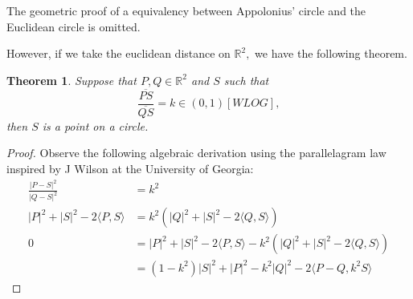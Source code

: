 \documentclass[letter]{article}
\newtheorem{theorem}{Theorem}
\newenvironment{menumerate}{%
  \edef\backupindent{\the\parindent}%
  \enumerate%
  \setlength{\parindent}{\backupindent}%
}{\endenumerate}
\begin{document}
\begin{menumerate}
        The geometric proof of a equivalency between Appolonius' circle and the
        Euclidean circle is omitted.

        However, if we take the euclidean distance on $\mathbb{R}^2,$ we have the following theorem.
        \begin{theorem}
            Suppose that $P,Q \in \mathbb{R}^2$ and $S$ such that 
            $$\frac{\overline{PS}}{\overline{QS}} = k \in (0,1)[WLOG],$$
            then $S$ is a point on a circle.
        \end{theorem}
        \begin{proof}
            Observe the following algebraic derivation using the parallelagram law inspired by J Wilson at the University of Georgia:
            \begin{equation}
                \begin{aligned}
                    \frac{|P-S|^2}{|Q-S|^2} &= k^2 \\
                     |P|^2 + |S|^2 -2\langle P, S \rangle &= k^2(|Q|^2 + |S|^2 - 2\langle Q,S\rangle ) \\
                     0&= |P|^2 + |S|^2 -2\langle P, S \rangle - k^2(|Q|^2 + |S|^2 - 2\langle Q,S\rangle ) \\
                     &= (1-k^2)|S|^2 + |P|^2 -k^2|Q|^2 -2\langle P - Q, k^2S \rangle
                \end{aligned}
            \end{equation}
        \end{proof}
\end{menumerate}
\end{document}
